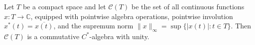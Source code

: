 Let $T$ be a compact space and let $\mathcal{C}(T)$ be the set of all continuous functions $x: T \to \mathbb{C}$, equipped with pointwise algebra operations, pointwise involution $x^*(t) = \overline{x(t)}$, and the supremum norm $\|x\|_\infty = \sup\{|x(t)| : t \in T\}$. Then $\mathcal{C}(T)$ is a commutative $C^*$-algebra with unity.
